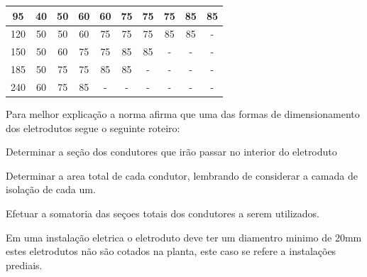\begin{table}[h]
\begin{tabular}{|c|c|c|c|c|c|c|c|c|c|}
95                                                                                  & 40                       & 50                       & 60                       & 60                       & 75                                               & 75                       & 75                       & 85                       & 85                        \\ \hline
120                                                                                 & 50                       & 50                       & 60                       & 75                       & 75                                               & 75                       & 85                       & 85                       & -                         \\ \hline
150                                                                                 & 50                       & 60                       & 75                       & 75                       & 85                                               & 85                       & -                        & -                        & -                         \\ \hline
185                                                                                 & 50                       & 75                       & 75                       & 85                       & 85                                               & -                        & -                        & -                        & -                         \\ \hline
240                                                                                 & 60                       & 75                       & 85                       & -                        & -                                                & -                        & -                        & -                        & -                         \\ \hline
\end{tabular}
\end{table}

Para melhor explicação a norma afirma que uma das formas de dimensionamento dos eletrodutos segue o seguinte roteiro:

\begin{description}
	\item Determinar a seção dos condutores que irão passar no interior do eletroduto
	\item Determinar a area total de cada condutor, lembrando de considerar a camada de isolação de cada um.
	\item Efetuar a somatoria das seçoes totais dos condutores a serem utilizados.
	\item Em uma instalação eletrica o eletroduto deve ter um diamentro minimo de 20mm estes eletrodutos não são cotados na planta, este caso se refere a instalações prediais.
\end{description}

